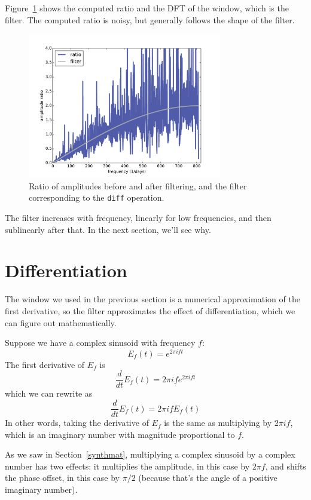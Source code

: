 \documentclass[12pt]{book}
\begin{document}
Figure~\ref{fig.diff_int3} shows the computed ratio and the DFT of the
window, which is the filter.  The computed ratio is noisy, but
generally follows the shape of the filter.

\begin{figure}
\centerline{\includegraphics[height=2.5in]{figs/systems3.pdf}}
\caption{Ratio of amplitudes before and after filtering, and
the filter corresponding to the {\tt diff} operation.}
\label{fig.diff_int3}
\end{figure}

The filter increases with frequency, linearly for low frequencies,
and then sublinearly after that.  In the next section, we'll see why.


\section{Differentiation}
\label{effdiff}

The window we used in the previous section is a
numerical approximation of the first derivative, so the filter
approximates the effect of differentiation, which we can
figure out mathematically.

Suppose we have a complex sinusoid with frequency $f$:
%
\[ E_f(t) = e^{2 \pi i f t} \]
%
The first derivative of $E_f$ is
%
\[ \frac{d}{dt} E_f(t) = 2 \pi i f e^{2 \pi i f t} \]
%
which we can rewrite as
%
\[ \frac{d}{dt} E_f(t) = 2 \pi i f E_f(t) \]
%
In other words, taking the derivative of $E_f$ is the same
as multiplying by $2 \pi i f$, which is an imaginary number
with magnitude proportional to $f$.

As we saw in Section~\ref{synthmat}, multiplying a complex sinusoid
by a complex number has two effects: it multiplies
the amplitude, in this case by $2 \pi f$, and shifts the phase
offset, in this case by $\pi/2$ (because that's the angle of
a positive imaginary number).
\end{document}
